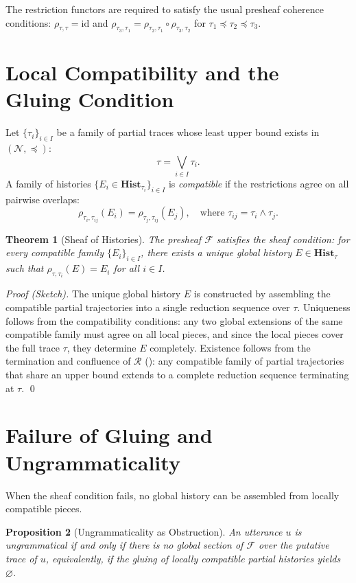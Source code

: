 \documentclass[12pt, oneside]{amsbook}
\theoremstyle{plain}
\newtheorem{theorem}{Theorem}[section]
\newtheorem{proposition}[theorem]{Proposition}
\theoremstyle{definition}
\theoremstyle{remark}
\newcommand{\NF}{\mathcal{N}}
\newcommand{\ruleR}{\mathcal{R}}
\begin{document}
The restriction functors are required to satisfy the usual presheaf
coherence conditions: $\rho_{\tau,\tau} = \mathrm{id}$ and
$\rho_{\tau_3,\tau_1} = \rho_{\tau_2,\tau_1} \circ \rho_{\tau_3,\tau_2}$
for $\tau_1 \preceq \tau_2 \preceq \tau_3$.

\section{Local Compatibility and the Gluing Condition}

Let $\{\tau_i\}_{i \in I}$ be a family of partial traces whose least upper
bound exists in $(\NF, \preceq)$:
\[
  \tau = \bigvee_{i \in I} \tau_i.
\]
A family of histories $\{E_i \in \mathbf{Hist}_{\tau_i}\}_{i \in I}$ is
\emph{compatible} if the restrictions agree on all pairwise overlaps:
\[
  \rho_{\tau_i, \tau_{ij}}(E_i) = \rho_{\tau_j, \tau_{ij}}(E_j),
  \quad \text{where } \tau_{ij} = \tau_i \wedge \tau_j.
\]

\begin{theorem}[Sheaf of Histories]
\label{thm:sheaf}
The presheaf $\mathcal{F}$ satisfies the sheaf condition: for every compatible
family $\{E_i\}_{i \in I}$, there exists a unique global history
$E \in \mathbf{Hist}_\tau$ such that $\rho_{\tau, \tau_i}(E) = E_i$ for all
$i \in I$.
\end{theorem}

\begin{proof}[Proof (Sketch)]
The unique global history $E$ is constructed by assembling the compatible
partial trajectories into a single reduction sequence over $\tau$. Uniqueness
follows from the compatibility conditions: any two global extensions of the
same compatible family must agree on all local pieces, and since the local
pieces cover the full trace $\tau$, they determine $E$ completely. Existence
follows from the termination and confluence of $\ruleR$
(): any compatible family of partial trajectories that
share an upper bound extends to a complete reduction sequence terminating
at $\tau$. \qed
\end{proof}

\section{Failure of Gluing and Ungrammaticality}

When the sheaf condition fails, no global history can be assembled from locally
compatible pieces.

\begin{proposition}[Ungrammaticality as Obstruction]
\label{prop:sheaf-ungramm}
An utterance $u$ is ungrammatical if and only if there is no global section
of $\mathcal{F}$ over the putative trace of $u$, equivalently, if the gluing
of locally compatible partial histories yields $\varnothing$.
\end{proposition}
\end{document}
